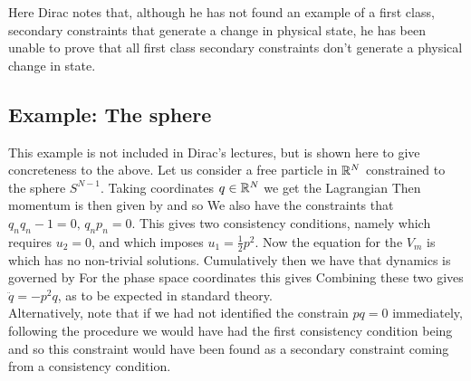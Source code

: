\documentclass{article}
\begin{document}
\begin{remark}
Here Dirac notes that, although he has not found an example of a first class, secondary constraints that generate a change in physical state, he has been unable to prove that all first class secondary constraints don't generate a physical change in state. 
\end{remark}

\subsection{Example: The sphere}
This example is not included in Dirac's lectures, but is shown here to give concreteness to the above. 
Let us consider a free particle in $\mathbb{R}^{N}$ constrained to the sphere $S^{N-1}$. Taking coordinates $q\in \mathbb{R}^{N}$ we get the Lagrangian 
Then momentum is then given by 
and so 
We also have the constraints that $q_n q_n - 1 = 0, \, q_n p_n = 0$. This gives two consistency conditions, namely 
which requires $u_2=0$, and 
which imposes $u_1 = \frac{1}{2}p^2$. Now the equation for the $V_m$ is 
which has no non-trivial solutions. Cumulatively then we have that dynamics is governed by 
For the phase space coordinates this gives 
Combining these two gives $\ddot{q} = -p^2q$, as to be expected in standard theory. \\
Alternatively, note that if we had not identified the constrain $pq=0$ immediately, following the procedure we would have had the first consistency condition being 
and so this constraint would have been found as a secondary constraint coming from a consistency condition. 
\end{document}
